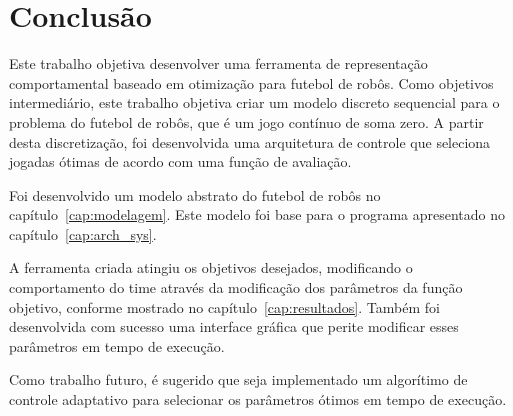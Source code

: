 \chapter*{Conclusão}\label{cap:conclusao}

Este trabalho objetiva desenvolver uma ferramenta de representação
comportamental baseado em otimização para futebol de robôs.
Como objetivos intermediário, este trabalho objetiva criar um modelo discreto
sequencial para o problema do futebol de robôs, que é um jogo contínuo de soma
zero. A partir desta discretização, foi desenvolvida uma arquitetura de
controle que seleciona jogadas ótimas de acordo com uma função de avaliação.

Foi desenvolvido um modelo abstrato do futebol de robôs no
capítulo~\ref{cap:modelagem}. Este modelo foi base para o
programa apresentado no capítulo~\ref{cap:arch_sys}.

A ferramenta criada atingiu os objetivos desejados, modificando o
comportamento do time através da modificação dos parâmetros da função
objetivo, conforme mostrado no capítulo~\ref{cap:resultados}. Também foi
desenvolvida com sucesso uma interface gráfica que perite modificar
esses parâmetros em tempo de execução.

Como trabalho futuro, é sugerido que seja implementado 
um algorítimo de controle adaptativo para selecionar os
parâmetros ótimos em tempo de execução.

